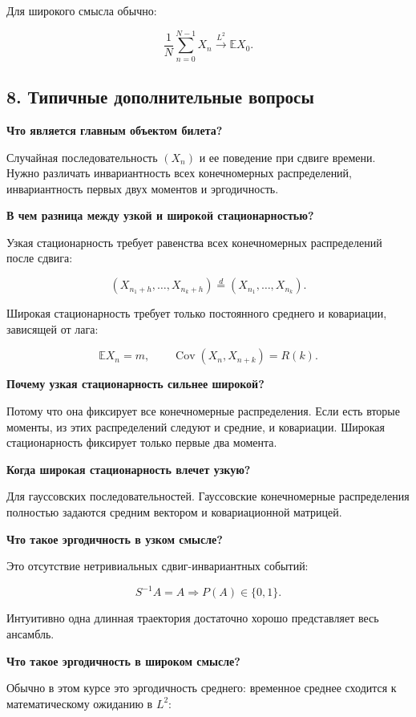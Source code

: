\documentclass[
  11pt,
  a4paper,
]{article}
\begin{document}
Для широкого смысла обычно:

\[
\frac1N\sum_{n=0}^{N-1}X_n
\xrightarrow{L^2}
\mathbb E X_0.
\]

\subsection{8. Типичные дополнительные
вопросы}\label{ux442ux438ux43fux438ux447ux43dux44bux435-ux434ux43eux43fux43eux43bux43dux438ux442ux435ux43bux44cux43dux44bux435-ux432ux43eux43fux440ux43eux441ux44b}

\textbf{Что является главным объектом билета?}

Случайная последовательность \((X_n)\) и ее поведение при сдвиге
времени. Нужно различать инвариантность всех конечномерных
распределений, инвариантность первых двух моментов и эргодичность.

\textbf{В чем разница между узкой и широкой стационарностью?}

Узкая стационарность требует равенства всех конечномерных распределений
после сдвига:

\[
(X_{n_1+h},\ldots,X_{n_k+h})
\stackrel d=
(X_{n_1},\ldots,X_{n_k}).
\]

Широкая стационарность требует только постоянного среднего и ковариации,
зависящей от лага:

\[
\mathbb E X_n=m,
\qquad
\operatorname{Cov}(X_n,X_{n+k})=R(k).
\]

\textbf{Почему узкая стационарность сильнее широкой?}

Потому что она фиксирует все конечномерные распределения. Если есть
вторые моменты, из этих распределений следуют и средние, и ковариации.
Широкая стационарность фиксирует только первые два момента.

\textbf{Когда широкая стационарность влечет узкую?}

Для гауссовских последовательностей. Гауссовские конечномерные
распределения полностью задаются средним вектором и ковариационной
матрицей.

\textbf{Что такое эргодичность в узком смысле?}

Это отсутствие нетривиальных сдвиг-инвариантных событий:

\[
S^{-1}A=A
\Rightarrow
P(A)\in\{0,1\}.
\]

Интуитивно одна длинная траектория достаточно хорошо представляет весь
ансамбль.

\textbf{Что такое эргодичность в широком смысле?}

Обычно в этом курсе это эргодичность среднего: временное среднее
сходится к математическому ожиданию в \(L^2\):
\end{document}
